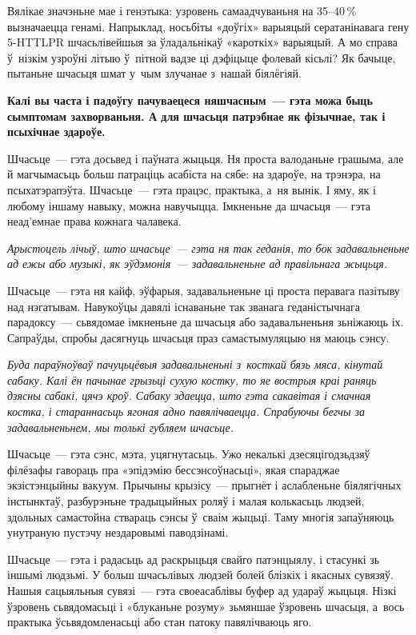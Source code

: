 Вялікае значэньне мае і генэтыка: узровень самаадчуваньня на 35--40\,\% вызначаецца генамі. Напрыклад, носьбіты «доўгіх» варыяцый сератанінавага гену 5-HTTLPR шчасьлівейшыя за ўладальнікаў «кароткіх» варыяцый. А мо справа ў~нізкім узроўні літыю ў~пітной вадзе ці дэфіцыце фолевай кісьлі? Як бачыце, пытаньне шчасьця шмат у~чым злучанае з~нашай біялёгіяй.

\textbf{Калі вы часта і падоўгу пачуваецеся няшчасным~--- гэта можа быць сымптомам захворваньня. А для шчасьця патрэбнае як фізычнае, так і псыхічнае здароўе.}

Шчасьце~--- гэта досьвед і паўната жыцьця. Ня проста валоданьне грашыма, але й магчымасьць больш патраціць асабіста на сябе: на здароўе, на трэнэра, на псыхатэрапэўта. Шчасьце~--- гэта працэс, практыка, а~ня вынік. І яму, як і любому іншаму навыку, можна навучыцца. Імкненьне да шчасьця~--- гэта неад'емнае права кожнага чалавека.

\emph{Арыстоцель лічыў, што шчасьце~--- гэта ня так геданія, то бок задавальненьне ад ежы або музыкі, як эўдэмонія~--- задавальненьне ад правільнага жыцьця.}

Шчасьце~--- гэта ня кайф, эўфарыя, задавальненьне ці проста перавага пазітыву над нэгатывам. Навукоўцы давялі існаваньне так званага геданістычнага парадоксу~--- сьвядомае імкненьне да шчасьця або задавальненьня зьніжаюць іх. Сапраўды, спробы дасягнуць шчасьця праз самастымуляцыю ня маюць сэнсу.

\emph{Буда параўноўваў пачуцьцёвыя задавальненьні з~косткай бязь мяса, кінутай сабаку. Калі ён пачынае грызьці сухую костку, то яе вострыя краі раняць дзясны сабакі, цячэ кроў. Сабаку здаецца, што гэта сакавітая і смачная костка, і стараннасьць ягоная адно павялічваецца. Спрабуючы бегчы за задавальненьнем, мы толькі губляем шчасьце.}

Шчасьце~--- гэта сэнс, мэта, уцягнутасьць. Ужо некалькі дзесяцігодзьдзяў філёзафы гавораць пра «эпідэмію бессэнсоўнасьці», якая спараджае экзістэнцыйны вакуум. Прычыны крызісу~--- прыгнёт і аслабленьне біялягічных інстынктаў, разбурэньне традыцыйных роляў і малая колькасьць людзей, здольных самастойна ствараць сэнсы ў~сваім жыцьці. Таму многія запаўняюць унутраную пустэчу нездаровымі паводзінамі.

Шчасьце~--- гэта і радасьць ад раскрыцьця свайго патэнцыялу, і стасункі зь іншымі людзьмі. У больш шчасьлівых людзей болей блізкіх і якасных сувязяў. Нашыя сацыяльныя сувязі~--- гэта своеасаблівы буфер ад удараў жыцьця. Нізкі ўзровень сьвядомасьці і «блуканьне розуму» зьмяншае ўзровень шчасьця, а~вось практыка ўсьвядомленасьці або стан патоку павялічваюць яго.

